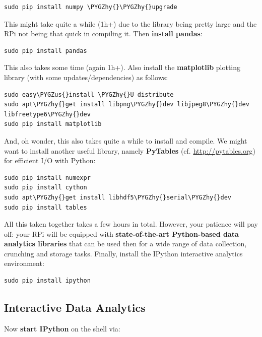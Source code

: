 \documentclass[letterpaper,10pt,english]{sphinxmanual}
\def\PYGZus{\char`\_}
\def\PYGZhy{\char`\-}
\begin{document}
\begin{Verbatim}[commandchars=\\\{\}]
sudo pip install numpy \PYGZhy{}\PYGZhy{}upgrade
\end{Verbatim}

This might take quite a while (1h+) due to the library being pretty large and the RPi not being that quick in compiling it. Then \textbf{install pandas}:

\begin{Verbatim}[commandchars=\\\{\}]
sudo pip install pandas
\end{Verbatim}

This also takes some time (again 1h+). Also install the \textbf{matplotlib} plotting library (with some updates/dependencies) as follows:

\begin{Verbatim}[commandchars=\\\{\}]
sudo easy\PYGZus{}install \PYGZhy{}U distribute
sudo apt\PYGZhy{}get install libpng\PYGZhy{}dev libjpeg8\PYGZhy{}dev libfreetype6\PYGZhy{}dev
sudo pip install matplotlib
\end{Verbatim}

And, oh wonder, this also takes quite a while to install and compile. We might want to install another useful library, namely \textbf{PyTables} (cf. \href{http://pytables.org}{http://pytables.org}) for efficient I/O with Python:

\begin{Verbatim}[commandchars=\\\{\}]
sudo pip install numexpr
sudo pip install cython
sudo apt\PYGZhy{}get install libhdf5\PYGZhy{}serial\PYGZhy{}dev
sudo pip install tables
\end{Verbatim}

All this taken together takes a few hours in total. However, your patience will pay off: your RPi will be equipped with \textbf{state-of-the-art Python-based data analytics libraries} that can be used then for a wide range of data collection, crunching and storage tasks. Finally, install the IPython interactive analytics environment:

\begin{Verbatim}[commandchars=\\\{\}]
sudo pip install ipython
\end{Verbatim}


\subsection{Interactive Data Analytics}
\label{02_data_analytics:interactive-data-analytics}
Now \textbf{start IPython} on the shell via:
\end{document}
